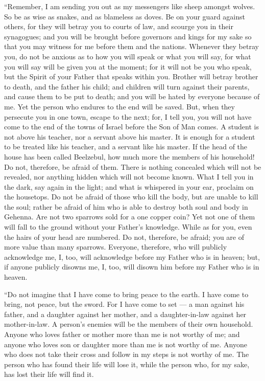  ``Remember, I am sending you out as my messengers like
sheep amongst wolves. So be as wise as snakes, and as blameless as
doves.  Be on your guard against others, for they will
betray you to courts of law, and scourge you in their synagogues;
 and you will be brought before governors and kings for my
sake so that you may witness for me before them and the nations.
 Whenever they betray you, do not be anxious as to how you
will speak or what you will say, for what you will say will be given you
at the moment;  for it will not be you who speak, but the
Spirit of your Father that speaks within you.  Brother will
betray brother to death, and the father his child; and children will
turn against their parents, and cause them to be put to death;
 and you will be hated by everyone because of me. Yet the
person who endures to the end will be saved.  But, when
they persecute you in one town, escape to the next; for, I tell you, you
will not have come to the end of the towns of Israel before the Son of
Man comes.  A student is not above his teacher, nor a
servant above his master.  It is enough for a student to be
treated like his teacher, and a servant like his master. If the head of
the house has been called Beelzebul, how much more the members of his
household!  Do not, therefore, be afraid of them. There is
nothing concealed which will not be revealed, nor anything hidden which
will not become known.  What I tell you in the dark, say
again in the light; and what is whispered in your ear, proclaim on the
housetops.  Do not be afraid of those who kill the body,
but are unable to kill the soul; rather be afraid of him who is able to
destroy both soul and body in Gehenna.  Are not two
sparrows sold for a one copper coin? Yet not one of them will fall to
the ground without your Father's knowledge.  While as for
you, even the hairs of your head are numbered.  Do not,
therefore, be afraid; you are of more value than many sparrows.
 Everyone, therefore, who will publicly acknowledge me, I,
too, will acknowledge before my Father who is in heaven; 
but, if anyone publicly disowns me, I, too, will disown him before my
Father who is in heaven.

 ``Do not imagine that I have come to bring peace to the
earth. I have come to bring, not peace, but the sword.  For
I have come to set --- a man against his father, and a daughter against
her mother, and a daughter-in-law against her mother-in-law.
 A person's enemies will be the members of their own
household.  Anyone who loves father or mother more than me
is not worthy of me; and anyone who loves son or daughter more than me
is not worthy of me.  Anyone who does not take their cross
and follow in my steps is not worthy of me.  The person who
has found their life will lose it, while the person who, for my sake,
has lost their life will find it.

